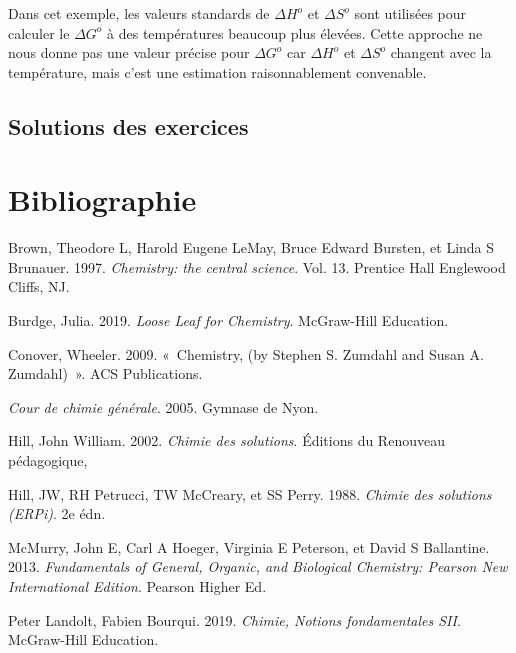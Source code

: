 \documentclass[
  11pt,
  french,
  a4paper,
  openany]{book}
\begin{document}
\begin{Answer}
Dans cet exemple, les valeurs standards de \(\Delta H^o\) et \(\Delta S^o\) sont utilisées pour calculer le \(\Delta G^o\) à des températures beaucoup plus élevées. Cette approche ne nous donne pas une valeur précise pour \(\Delta G^o\) car \(\Delta H^o\) et \(\Delta S^o\) changent avec la température, mais c'est une estimation raisonnablement convenable.


\end{Answer}

\section{Solutions des exercices} \shipoutAnswer

\hypertarget{bibliographie}{%
\chapter*{Bibliographie}\label{bibliographie}}

\hypertarget{refs}{}
\leavevmode\hypertarget{ref-brown1997chemistry}{}%
Brown, Theodore L, Harold Eugene LeMay, Bruce Edward Bursten, et Linda S Brunauer. 1997. \emph{Chemistry: the central science}. Vol. 13. Prentice Hall Englewood Cliffs, NJ.

\leavevmode\hypertarget{ref-burdgelooseleafforchemistry}{}%
Burdge, Julia. 2019. \emph{Loose Leaf for Chemistry}. McGraw-Hill Education.

\leavevmode\hypertarget{ref-conover2009chemistry}{}%
Conover, Wheeler. 2009. «~Chemistry, (by Stephen S. Zumdahl and Susan A. Zumdahl)~». ACS Publications.

\leavevmode\hypertarget{ref-gnv2005chimie}{}%
\emph{Cour de chimie générale}. 2005. Gymnase de Nyon.

\leavevmode\hypertarget{ref-hill2002chimie}{}%
Hill, John William. 2002. \emph{Chimie des solutions}. Éditions du Renouveau pédagogique,

\leavevmode\hypertarget{ref-hill1988chimie}{}%
Hill, JW, RH Petrucci, TW McCreary, et SS Perry. 1988. \emph{Chimie des solutions (ERPi)}. 2e édn.

\leavevmode\hypertarget{ref-mcmurry2013fundamentals}{}%
McMurry, John E, Carl A Hoeger, Virginia E Peterson, et David S Ballantine. 2013. \emph{Fundamentals of General, Organic, and Biological Chemistry: Pearson New International Edition}. Pearson Higher Ed.

\leavevmode\hypertarget{ref-LandoltBourqui2010}{}%
Peter Landolt, Fabien Bourqui. 2019. \emph{Chimie, Notions fondamentales SII}. McGraw-Hill Education.
\end{document}
